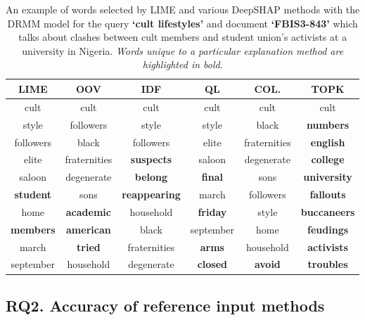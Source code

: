 \begin{table}[h]
    \centering
    \begin{tabular}{cccccc}
        \toprule
        LIME & OOV & IDF & QL & COL. & TOPK\\
        \midrule
cult & cult & cult & cult & cult & cult \\
style & followers & style & style & black & {\bf numbers} \\
followers & black & followers & elite & fraternities & {\bf english} \\
elite & fraternities & {\bf suspects} & saloon & degenerate & {\bf college} \\
saloon & degenerate & {\bf belong} & {\bf final} & sons & {\bf university} \\
{\bf student} & sons & {\bf reappearing} & march & followers & {\bf fallouts} \\
home & {\bf academic} & household & {\bf friday} & style & {\bf buccaneers} \\
{\bf members} & {\bf american} & black & september & home & {\bf feudings} \\
march & {\bf tried} & fraternities & {\bf arms} & household & {\bf activists} \\
september & household & degenerate & {\bf closed} & {\bf avoid} & {\bf troubles} \\
        \bottomrule
    \end{tabular}
    \caption[Comparison of explanations from LIME and various DeepSHAP methods for an example document with DRMM.]{An example of words selected by LIME and various DeepSHAP methods with the \textsf{DRMM} model for the query {\bf `cult lifestyles'} and document {\bf `FBIS3-843'} which talks about clashes between cult members and student union's activists at a university in Nigeria. {\it Words unique to a particular explanation method are highlighted in bold}.}
    \label{tab:drmm_qualitative_example}
\end{table}

\subsection{RQ2. Accuracy of reference input methods}\label{sec:interpretability_rq2}

